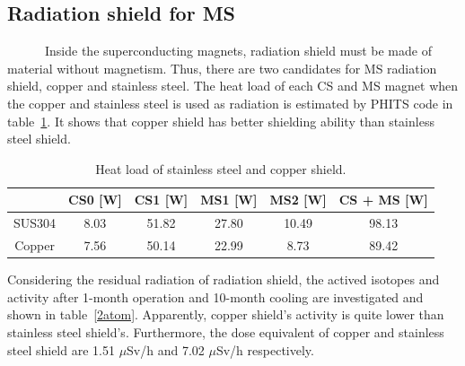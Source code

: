  \subsection{Radiation shield for MS}
~~~~~~Inside the superconducting magnets, radiation shield must be made of material without magnetism.
Thus, there are two candidates for MS radiation shield, copper and stainless steel.
The heat load of each CS and MS magnet when the copper and stainless steel is used as radiation is estimated by PHITS code in table~\ref{hrsload}.
It shows that copper shield has better shielding ability than stainless steel shield.
 \begin{table}[H]
 \centering
 \begin{tabular}{cccccc} \hline \hline
  & CS0 [W] & CS1 [W] & MS1 [W] & MS2 [W] & CS + MS [W] \\ \hline
  SUS304 & 8.03 & 51.82 & 27.80 & 10.49 & 98.13 \\
  Copper & 7.56 & 50.14 & 22.99 & 8.73 & 89.42 \\ \hline \hline
 \end{tabular}
 \caption{Heat load of stainless steel and copper shield.}
 \label{hrsload}
\end{table}
Considering the residual radiation of radiation shield, the actived isotopes and activity after 1-month operation and 10-month cooling are investigated and shown in table~\ref{2atom}.
Apparently, copper shield's activity is quite lower than stainless steel shield's.
Furthermore, the dose equivalent of copper and stainless steel shield are 1.51 $\mu$Sv/h and 7.02 $\mu$Sv/h respectively.
